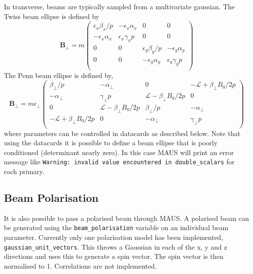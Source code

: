 In transverse, beams are typically sampled from a multivariate gaussian. The Twiss beam ellipse is defined by
\begin{equation}
\mathbf{B_\perp} = m \left(\begin{array}{cccc}
\epsilon_x \beta_x/p   & -\epsilon_x\alpha_x & 0 & 0 \\
-\epsilon_x\alpha_x & \epsilon_x\gamma_x p  & 0 & 0 \\
0 & 0  & \epsilon_y\beta_y/p  & -\epsilon_y\alpha_y \\
0 & 0 & -\epsilon_y\alpha_y & \epsilon_y\gamma_y p \\
\end{array}\right)
\end{equation}
The Penn beam ellipse is defined by,
\begin{equation}
\mathbf{B_\perp} = m\epsilon_\perp \left(\begin{array}{cccc}
\beta_\perp/p   & -\alpha_\perp & 0 & -\mathcal{L}+\beta_\perp B_0/2p \\
-\alpha_\perp & \gamma_\perp p  & \mathcal{L}-\beta_\perp B_0/2p & 0 \\
0 & \mathcal{L}-\beta_\perp B_0/2p  & \beta_\perp/p  & -\alpha_\perp \\
-\mathcal{L}+\beta_\perp B_0/2p & 0 & -\alpha_\perp & \gamma_\perp p \\
\end{array}\right)
\end{equation}
where parameters can be controlled in datacards as described below. Note that using the datacards it is possible to define a beam ellipse that is poorly conditioned (determinant nearly zero). In this case MAUS will print an error message like \verb|Warning: invalid value encountered in double_scalars| for each primary.

\subsection{Beam Polarisation}
It is also possible to pass a polarised beam through MAUS. A polarised beam can be generated using the \verb|beam_polarisation| variable on an individual beam parameter. Currently only one polarisation model has been implemented, \verb|gaussian_unit_vectors|. This throws a Gaussian in each of the x, y and z directions and uses this to generate a spin vector. The spin vector is then normalised to 1. Correlations are not implemented.

